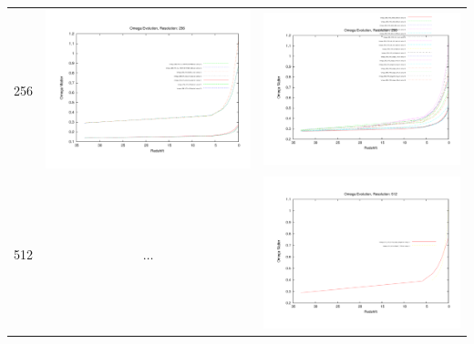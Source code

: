 \begin{itemize}
\begin{table}
\begin{tabular}{l|c|c}
 256 & \includegraphics[scale=0.2]{analysis/omega_evolution/omega_evolution_256_h70.pdf} & \includegraphics[scale=0.2]{analysis/omega_evolution/omega_evolution_256_h100.pdf} \\
 512 & $\dots$ & \includegraphics[scale=0.2]{analysis/omega_evolution/omega_evolution_512_h100.pdf} \\


\end{tabular}
\end{table}
\end{itemize}
